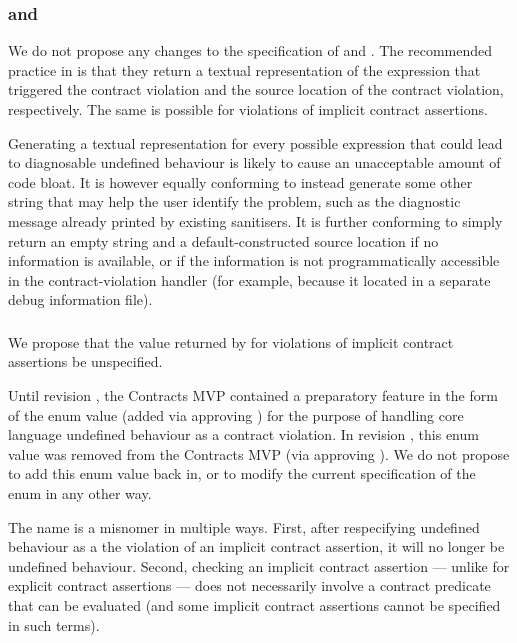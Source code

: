 \subsubsection{ and }
We do not propose any changes to the specification of  and . The recommended practice in \cite{P2900R6} is that they return a textual representation of the expression that triggered the contract violation and the source location of the contract violation, respectively. The same is possible for violations of implicit contract assertions.

Generating a textual representation for every possible expression that could lead to diagnosable undefined behaviour is likely to cause an unacceptable amount of code bloat. It is however equally conforming to instead generate some other string that may help the user identify the problem, such as the diagnostic message already printed by existing sanitisers. It is further conforming to simply return an empty string and a default-constructed source location if no information is available, or if the information is not programmatically accessible in the contract-violation handler (for example, because it located in a separate debug information file).

\subsubsection{}
We propose that the value returned by  for violations of implicit contract assertions be unspecified.

Until revision \cite{P2900R4}, the Contracts MVP contained a preparatory feature in the form of the enum value \mbox{} (added via approving \cite{P2811R7}) for the purpose of handling core language undefined behaviour as a contract violation. In revision \cite{P2900R5}, this enum value was removed from the Contracts MVP (via approving \cite{P3073R0}). We do not propose to add this enum value back in, or to modify the current specification of the  enum in any other way.

The name  is a misnomer in multiple ways. First, after respecifying undefined behaviour as a the violation of an implicit contract assertion, it will no longer be undefined behaviour. Second, checking an implicit contract assertion --- unlike for explicit contract assertions --- does not necessarily involve a contract predicate that can be evaluated (and some implicit contract assertions cannot be specified in such terms).

